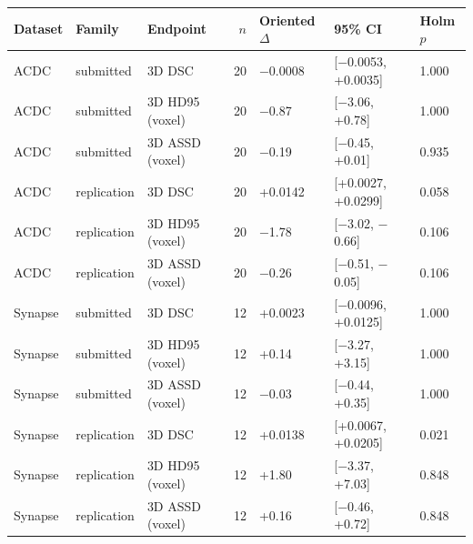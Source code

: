 \begin{tabular}{lllrlll}
\toprule
Dataset & Family & Endpoint & $n$ & Oriented $\Delta$ & 95\% CI & Holm $p$ \\
\midrule
ACDC & submitted & 3D DSC & 20 & $-$0.0008 & [$-$0.0053, +0.0035] & 1.000 \\
ACDC & submitted & 3D HD95 (voxel) & 20 & $-$0.87 & [$-$3.06, +0.78] & 1.000 \\
ACDC & submitted & 3D ASSD (voxel) & 20 & $-$0.19 & [$-$0.45, +0.01] & 0.935 \\
ACDC & replication & 3D DSC & 20 & +0.0142 & [+0.0027, +0.0299] & 0.058 \\
ACDC & replication & 3D HD95 (voxel) & 20 & $-$1.78 & [$-$3.02, $-$0.66] & 0.106 \\
ACDC & replication & 3D ASSD (voxel) & 20 & $-$0.26 & [$-$0.51, $-$0.05] & 0.106 \\
Synapse & submitted & 3D DSC & 12 & +0.0023 & [$-$0.0096, +0.0125] & 1.000 \\
Synapse & submitted & 3D HD95 (voxel) & 12 & +0.14 & [$-$3.27, +3.15] & 1.000 \\
Synapse & submitted & 3D ASSD (voxel) & 12 & $-$0.03 & [$-$0.44, +0.35] & 1.000 \\
Synapse & replication & 3D DSC & 12 & +0.0138 & [+0.0067, +0.0205] & 0.021 \\
Synapse & replication & 3D HD95 (voxel) & 12 & +1.80 & [$-$3.37, +7.03] & 0.848 \\
Synapse & replication & 3D ASSD (voxel) & 12 & +0.16 & [$-$0.46, +0.72] & 0.848 \\
\bottomrule
\end{tabular}
